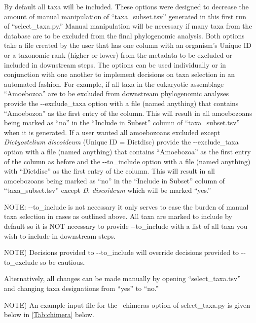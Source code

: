 \documentclass{article}
\begin{document}
\begin{enumerate}[itemsep=12pt]
    \vspace{0.2cm}
    By default all taxa will be included. These options were designed to decrease the amount of manual manipulation of “taxa\_subset.tsv” generated in this first run of “select\_taxa.py.” Manual manipulation will be  necessary if many taxa from the database are to be excluded from the final phylogenomic analysis. Both options take a file created by the user that has one column with an organism’s Unique ID or a taxonomic rank (higher or lower) from the metadata to be excluded or included in downstream steps. The options can be used individually or in conjunction with one another to implement decisions on taxa selection in an automated fashion. For example, if all taxa in the eukaryotic assemblage “Amoebozoa” are to be excluded from downstream phylogenomic analyses provide the -\/-exclude\_taxa option with a file (named anything) that contains “Amoebozoa” as the first entry of the column. This will result in all amoebozoans being marked as “no” in the “Include in Subset” column of “taxa\_subset.tsv” when it is generated. If a user wanted all amoebozoans excluded except \textit{Dictyostelium discoideum} (Unique ID = Dictdisc) provide the -\/-exclude\_taxa option with a file (named anything) that contains “Amoebozoa” as the first entry of the column as before and the -\/-to\_include option with a file (named anything) with “Dictdisc” as the first entry of the column. This will result in all amoebozoans being marked as “no” in the “Include in Subset” column of “taxa\_subset.tsv” except \textit{D}. \textit{discoideum} which will be marked “yes.”
    
    \vspace{0.2cm}
    NOTE: -\/-to\_include is not necessary it only serves to ease the burden of manual taxa selection in cases as outlined above. All taxa are marked to include by default so it is NOT necessary to provide -\/-to\_include with a list of all taxa you wish to include in downstream steps.
    
    \vspace{0.2cm}
    NOTE) Decisions provided to -\/-to\_include will override decisions provided to -\/-to\_exclude so be cautious.
    
    Alternatively, all changes can be made manually by opening “select\_taxa.tsv” and changing taxa designations from “yes” to “no.”
    
    \vspace{0.2cm}
    NOTE) An example input file for the --chimeras option of select\_taxa.py is given below in \autoref{Tab:chimera} below.
    

\end{enumerate}
\end{document}
